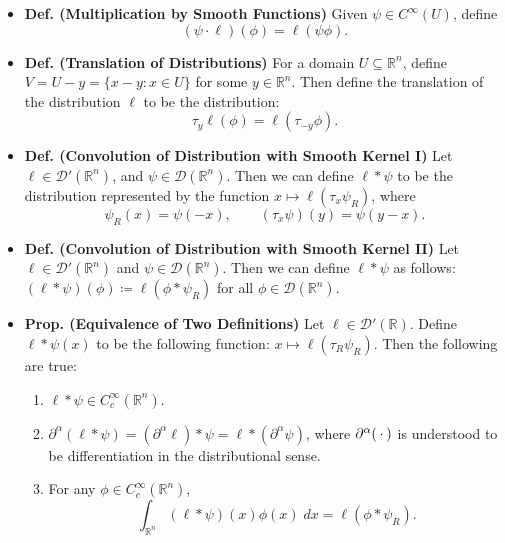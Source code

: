 \documentclass{article}
\begin{document}
\begin{itemize}
		\item \textbf{Def. (Multiplication by Smooth Functions)} Given $\psi \in C^{\infty}(U)$, define 
		\begin{equation}
			(\psi \cdot \ell)(\phi) = \ell(\psi \phi). 
		\end{equation}
		
		\item \textbf{Def. (Translation of Distributions)} For a domain $U \subseteq \mathbb{R}^{n}$, define $V = U - y = \{x - y: x \in U\}$ for some $y \in \mathbb{R}^{n}$. Then define the translation of the distribution $\ell$ to be the distribution: 
		\begin{equation}
			\tau_{y}\ell(\phi) = \ell(\tau_{-y}\phi). 
		\end{equation}
	
	\item \textbf{Def. (Convolution of Distribution with Smooth Kernel I)} Let $\ell \in \mathcal{D}'(\mathbb{R}^{n})$, and $\psi \in \mathcal{D}(\mathbb{R}^{n})$. Then we can define $\ell \ast \psi$ to be the distribution represented by the function $x \mapsto \ell(\tau_{x}\psi_{R})$, where 
		\begin{equation}
			\psi_{R}(x) =\psi(-x), \qquad (\tau_{x}\psi)(y) = \psi(y - x). 
		\end{equation}
	
	\item \textbf{Def. (Convolution of Distribution with Smooth Kernel II)} Let $\ell \in \mathcal{D}'(\mathbb{R}^{n})$ and $\psi \in \mathcal{D}(\mathbb{R}^{n})$. Then we can define $\ell \ast \psi$ as follows: $(\ell \ast \psi)(\phi) \coloneqq \ell(\phi \ast \psi_{R})$ for all $\phi \in \mathcal{D}(\mathbb{R}^{n})$. 
	
	\item \textbf{Prop. (Equivalence of Two Definitions)} Let $\ell \in \mathcal{D}'(\mathbb{R})$. Define $\ell \ast \psi(x)$ to be the following function: $x \mapsto \ell(\tau_{R}\psi_{R})$. Then the following are true:\vspace{-0.25cm}
		\begin{enumerate}[itemsep =-2pt,label = (\arabic{*})]
			\item $\ell \ast \psi \in C_{c}^{\infty}(\mathbb{R}^{n})$. 
			\item $\partial^{\alpha}(\ell \ast \psi) = (\partial^{\alpha}\ell) \ast \psi = \ell \ast (\partial^{\alpha}\psi)$, where $\partial^{\alpha}(\hspace{2pt}\cdot\hspace{2pt})$ is understood to be differentiation in the distributional sense. 
			\item For any $\phi \in C_{c}^{\infty}(\mathbb{R}^{n})$, 
				\begin{equation}
					\int_{\mathbb{R}^{n}}(\ell \ast \psi)(x)\phi(x)\;dx = \ell(\phi \ast \psi_{R}). 
				\end{equation}
		\end{enumerate}
\end{itemize}
\end{document}
